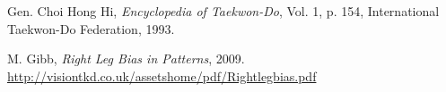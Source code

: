 \documentclass[10pt,twocolumn,a4paper]{article}
\begin{document}





\begin{thebibliography}{99}
    \small  %

      Gen. Choi Hong Hi,
      \emph{Encyclopedia of Taekwon-Do}, Vol. 1, p. 154,
      International Taekwon-Do Federation, 1993.

      M. Gibb,
      \emph{Right Leg Bias in Patterns}, 2009.
      \url{http://visiontkd.co.uk/assetshome/pdf/Rightlegbias.pdf}













\end{thebibliography}
\end{document}
